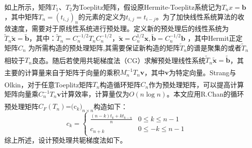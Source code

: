 \documentclass[twoside,UTF8]{nputhesis}
\newcommand{\upcite}[1]{\textsuperscript{\textsuperscript{\cite{#1}}}}
\begin{document}
如上所示，矩阵$T_{1}$、$T_{2}$为Toeplitz矩阵，假设原Hermite-Toeplitz系统记为${{T}_{n}}x=\bm{b}$，其中矩阵$T_{n}=(t_{i,j})_{n}$的元素的定义为${{t}_{i,j}}={{t}_{i-j}}$。为了加快线性系统算法的收敛速度，需要对于原线性系统进行预处理。定义新的预处理后的线性系统为${{\tilde{T}}_{n}}\bm{\tilde{x}}=\bm{\tilde{b}}$，其中：${{\tilde{T}}_{n}}=C_{n}^{-1/2}{{T}_{n}}C_{n}^{-1/2}$，$\bm{\tilde{x}}=C_{n}^{1/2}\bm{x},\bm{\tilde{b}}=C_{n}^{-1/2}\bm{b}$ ，其中Hermit正定矩阵$C_{n}$ 为所需构造的预处理矩阵,其需要保证新构造的矩阵${{\tilde{T}}_{n}}$的谱是聚集的或者${{\tilde{T}}_{n}}$相较于${{T}_{n}}$良态\upcite{chan2007introduction}。随后若使用共轭梯度法（CG）求解预处理线性系统${{\tilde{T}}_{n}}\bm{\tilde{x}}=\bm{\tilde{b}}$，其主要的计算量来自于矩阵于向量的乘积$M_{n}^{-1}{{T}_{n}}\bm{v}$，其中$\bm{v}$为特定向量\upcite{golub1996cf,jin2006numerical,saad2003iterative}。Strang\upcite{strang1986proposal}与Olkin\upcite{olkin1986linear}，对于任意Toeplitz矩阵${{T}_{n}}$构造循环矩阵${{C}_{n}}$作为预处理矩阵，可以提高计算矩阵向量乘$C_{n}^{-1}{{T}_{n}}\bm{v}$计算效率，计算量仅为$O(n\log n)$。本文应用R.Chan的循环预处理矩阵${{C}_{F}}({{T}_{n}})\text{=(}{{\text{c}}_{k}}{{)}_{n\times n}}$构造如下\upcite{chan1995best}：
\begin{equation}
c_{k}=\left\{\begin{array}{ll}{\frac{(n-k) t_{k}+k t_{k-n}}{n}} & {0 \leq k \leq n-1} \\ {c_{n+k}} & {0 \leq-k \leq n-1}\end{array}\right.
\end{equation}
综上所述，设计预处理共轭梯度法如下。
\end{document}
